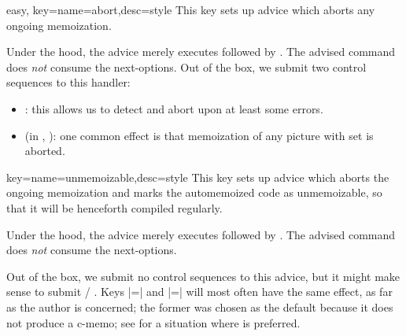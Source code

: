 \documentclass[a4paper,11pt]{article}
\begin{document}
\begin{doc}{easy, key={name=abort,desc=style}}
  This key sets up advice which aborts any ongoing memoization.

  Under the hood, the advice merely executes  followed by
  .  The advised command does \emph{not} consume the
  next-options.  Out of the box, we submit two control sequences to this
  handler:
  \begin{itemize}
  \item {}: this allows us to detect and abort upon at least some
    errors.
  \item {} (in ,
    ): one common effect is that memoization of any
    \TikZ picture with  set is aborted.
  \end{itemize}
\end{doc}


\begin{doc}{key={name=unmemoizable,desc=style}}
  This key sets up advice which aborts the ongoing memoization and marks the
  automemoized code as unmemoizable, so that it will be henceforth compiled
  regularly.

  Under the hood, the advice merely executes  followed
  by .  The advised command does \emph{not} consume the
  next-options.

  Out of the box, we submit no control sequences to this advice, but it might
  make sense to submit \slash
  .  Keys |=|
  and |=| will most often have
  the same effect, as far as the author is concerned; the former was chosen as
  the default because it does not produce a c-memo; see
   for a situation where  is
  preferred.
\end{doc}
\end{document}
